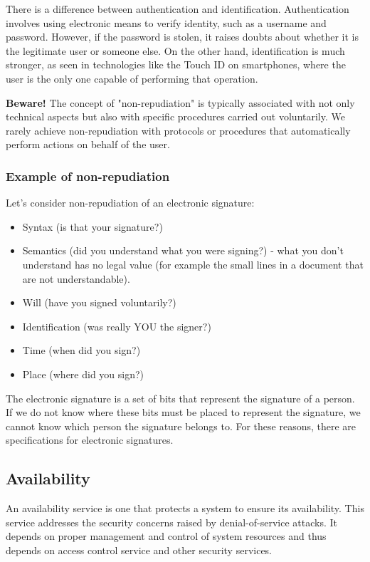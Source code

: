 There is a difference between authentication and identification. Authentication involves using electronic means to verify identity, such as a username and password. However, if the password is stolen, it raises doubts about whether it is the legitimate user or someone else. On the other hand, identification is much stronger, as seen in technologies like the Touch ID on smartphones, where the user is the only one capable of performing that operation.

\textbf{Beware!} The concept of "non-repudiation" is typically associated with not only technical aspects but also with specific procedures carried out voluntarily. We rarely achieve non-repudiation with protocols or procedures that automatically perform actions on behalf of the user.

\subsubsection*{Example of non-repudiation}
Let's consider non-repudiation of an electronic signature:
\begin{itemize}
  \item Syntax (is that your signature?)
  \item Semantics (did you understand what you were signing?) - what you don't understand has no legal value (for example the small lines in a document that are not understandable).
  \item Will (have you signed voluntarily?)
  \item Identification (was really YOU the signer?)
  \item Time (when did you sign?)
  \item Place (where did you sign?)
\end{itemize}
The electronic signature is a set of bits that represent the signature of a person. If we do not know where these bits must be placed to represent the signature, we cannot know which person the signature belongs to. For these reasons, there are specifications for electronic signatures.


\subsection{Availability}
An availability service is one that protects a system to ensure its availability. This service addresses the security
concerns raised by denial-of-service attacks. It depends on proper management and control of system resources
and thus depends on access control service and other security services.



